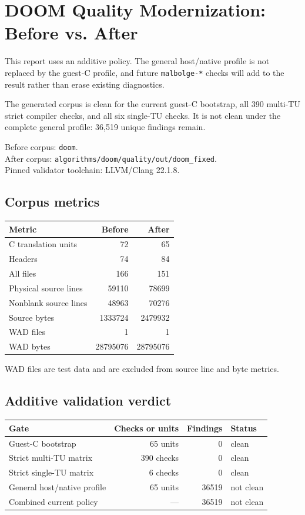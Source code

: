\documentclass[11pt]{article}
\begin{document}
\section*{DOOM Quality Modernization: Before vs. After}

This report uses an additive policy. The general host/native profile is not
replaced by the guest-C profile, and future \texttt{malbolge-*} checks will add
to the result rather than erase existing diagnostics.

The generated corpus is clean for the current guest-C bootstrap, all 390
multi-TU strict compiler checks, and all six single-TU checks. It is not clean
under the complete general profile: 36,519 unique findings remain.

Before corpus: \texttt{doom}.\\
After corpus:
\texttt{algorithms/doom/quality/out/doom\_fixed}.\\
Pinned validator toolchain: LLVM/Clang 22.1.8.

\subsection*{Corpus metrics}
\begin{tabular}{lrr}
\toprule
Metric & Before & After \\
\midrule
C translation units & 72 & 65 \\
Headers & 74 & 84 \\
All files & 166 & 151 \\
Physical source lines & 59110 & 78699 \\
Nonblank source lines & 48963 & 70276 \\
Source bytes & 1333724 & 2479932 \\
WAD files & 1 & 1 \\
WAD bytes & 28795076 & 28795076 \\
\bottomrule
\end{tabular}

WAD files are test data and are excluded from source line and byte metrics.

\subsection*{Additive validation verdict}
\begin{tabular}{lrrl}
\toprule
Gate & Checks or units & Findings & Status \\
\midrule
Guest-C bootstrap & 65 units & 0 & clean \\
Strict multi-TU matrix & 390 checks & 0 & clean \\
Strict single-TU matrix & 6 checks & 0 & clean \\
General host/native profile & 65 units & 36519 & not clean \\
Combined current policy & --- & 36519 & not clean \\
\bottomrule
\end{tabular}
\end{document}
